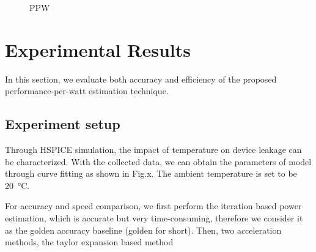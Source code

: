\begin{figure}[htb]
\centering
{}%
%
\caption{PPW}  
\label{fig:ppw}
\end{figure}


\section{Experimental Results}

In this section, we evaluate both accuracy and efficiency of the proposed performance-per-watt estimation technique.

\subsection{Experiment setup}
Through HSPICE simulation, the impact of temperature on device leakage can be characterized. With the collected data, we can obtain the parameters of model through curve fitting as shown in Fig.x. The ambient temperature is set to be \SI{20}{\degreeCelsius}.

For accuracy and speed comparison, we first perform the iteration based power estimation, which is accurate but very time-consuming, therefore we consider it as the golden accuracy baseline (golden for short). Then, two acceleration methods, the taylor expansion based method 